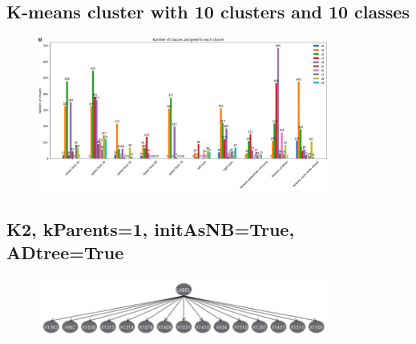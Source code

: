 \documentclass[11pt]{article}
\begin{document}
\begin{appendices}
\newpage
\subsection{K-means cluster with 10 clusters and 10 classes}\label{Kmeans10Clusters10Classes} 
\begin{figure}[h!]
  \centering
  \includegraphics[width=0.85\textwidth]{images/Kmeans10Clusters10Classes.png}
\end{figure}

\newpage
\subsection{K2, kParents=1, initAsNB=True, ADtree=True}\label{image71} 
\begin{figure}[h!]
  \centering
  \includegraphics[width=0.85\textwidth]{images/7_1.png}
\end{figure}

\newpage

\end{appendices}
\end{document}
